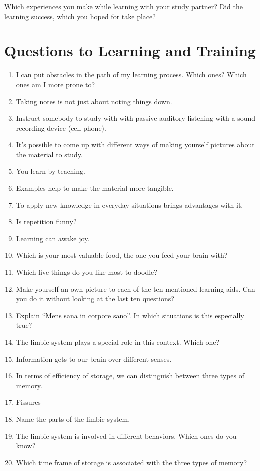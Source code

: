 \documentclass[../main.tex]{subfiles}
\begin{document}
Which experiences you make while learning with your study partner?
Did the learning success, which you hoped for take place?

\section[Question]{Questions to Learning and Training}
\begin{enumerate}
\item I can put obstacles in the path of my learning process. Which ones? Which ones am I more prone to?
\item Taking notes is not just about noting things down.
\item Instruct somebody to study with with passive auditory listening with a sound recording device (cell phone).
\item It's possible to come up with different ways of making yourself pictures about the material to study.
\item You learn by teaching.
\item Examples help to make the material more tangible.
\item To apply new knowledge in everyday situations brings advantages with it.
\item Is repetition funny?
\item Learning can awake joy.
\item Which is your most valuable food, the one you feed your brain with?
\item Which five things do you like most to doodle?
\item Make yourself an own picture to each of the ten mentioned learning aids.
  Can you do it without looking at the last ten questions?
\item Explain ``Mens sana in corpore sano''. In which situations is this especially true?
\item The limbic system plays a special role in this context. Which one?
\item Information gets to our brain over different senses.
\item In terms of efficiency of storage, we can distinguish between three types of memory.
\item Fissures
\item Name the parts of the limbic system.
\item The limbic system is involved in different behaviors. Which ones do you know?
\item Which time frame of storage is associated with the three types of memory?

\end{enumerate}
\end{document}
